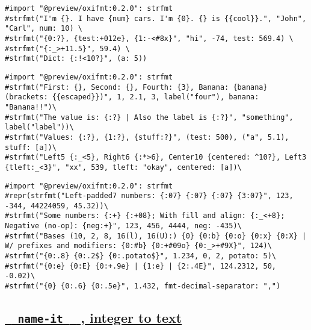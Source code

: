 \begin{verbatim}
#import "@preview/oxifmt:0.2.0": strfmt
#strfmt("I'm {}. I have {num} cars. I'm {0}. {} is {{cool}}.", "John", "Carl", num: 10) \
#strfmt("{0:?}, {test:+012e}, {1:-<#8x}", "hi", -74, test: 569.4) \
#strfmt("{:_>+11.5}", 59.4) \
#strfmt("Dict: {:!<10?}", (a: 5))
\end{verbatim}

\pandocbounded{}

\begin{verbatim}
#import "@preview/oxifmt:0.2.0": strfmt
#strfmt("First: {}, Second: {}, Fourth: {3}, Banana: {banana} (brackets: {{escaped}})", 1, 2.1, 3, label("four"), banana: "Banana!!")\
#strfmt("The value is: {:?} | Also the label is {:?}", "something", label("label"))\
#strfmt("Values: {:?}, {1:?}, {stuff:?}", (test: 500), ("a", 5.1), stuff: [a])\
#strfmt("Left5 {:_<5}, Right6 {:*>6}, Center10 {centered: ^10?}, Left3 {tleft:_<3}", "xx", 539, tleft: "okay", centered: [a])\
\end{verbatim}

\pandocbounded{}

\begin{verbatim}
#import "@preview/oxifmt:0.2.0": strfmt
#repr(strfmt("Left-padded7 numbers: {:07} {:07} {:07} {3:07}", 123, -344, 44224059, 45.32))\
#strfmt("Some numbers: {:+} {:+08}; With fill and align: {:_<+8}; Negative (no-op): {neg:+}", 123, 456, 4444, neg: -435)\
#strfmt("Bases (10, 2, 8, 16(l), 16(U):) {0} {0:b} {0:o} {0:x} {0:X} | W/ prefixes and modifiers: {0:#b} {0:+#09o} {0:_>+#9X}", 124)\
#strfmt("{0:.8} {0:.2$} {0:.potato$}", 1.234, 0, 2, potato: 5)\
#strfmt("{0:e} {0:E} {0:+.9e} | {1:e} | {2:.4E}", 124.2312, 50, -0.02)\
#strfmt("{0} {0:.6} {0:.5e}", 1.432, fmt-decimal-separator: ",")
\end{verbatim}

\pandocbounded{}

\subsection{\texorpdfstring{\hyperref[name-it-integer-to-text]{\texttt{\ }{\texttt{\ name-it\ }}\texttt{\ }
, integer to
text}}{  name-it   , integer to text}}\label{name-it-integer-to-text}

